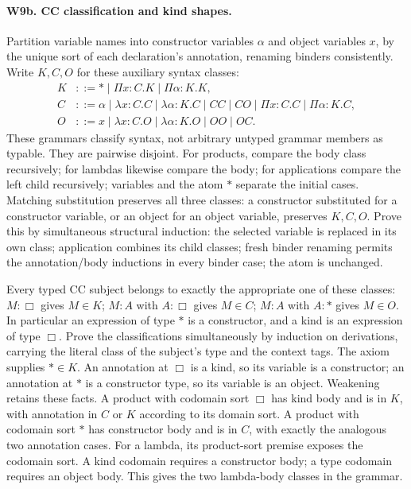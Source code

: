 \paragraph{W9b. CC classification and kind shapes.}
Partition variable names into constructor variables \(\alpha\) and
object variables \(x\), by the unique sort of each declaration's
annotation, renaming binders consistently. Write \(K,C,O\) for these
auxiliary syntax classes:
\[
\begin{aligned}
 K&::=\ast\mid\Pi x:C.K\mid\Pi\alpha:K.K,\\
 C&::=\alpha\mid\lambda x:C.C\mid\lambda\alpha:K.C
       \mid CC\mid CO\mid\Pi x:C.C\mid\Pi\alpha:K.C,\\
 O&::=x\mid\lambda x:C.O\mid\lambda\alpha:K.O\mid OO\mid OC.
\end{aligned}
\]
These grammars classify syntax, not arbitrary untyped grammar members
as typable. They are pairwise disjoint. For products, compare the body
class recursively; for lambdas likewise compare the body; for applications
compare the left child recursively; variables and the atom \(\ast\)
separate the initial cases. Matching substitution preserves all three
classes: a constructor substituted for a constructor variable, or an
object for an object variable, preserves \(K,C,O\). Prove this by
simultaneous structural induction: the selected variable is replaced
in its own class; application combines its child classes; fresh binder
renaming permits the annotation/body inductions in every binder case;
the atom is unchanged.

Every typed CC subject belongs to exactly the appropriate one of these
classes: \(M:\Box\) gives \(M\in K\); \(M:A\) with
\(A:\Box\) gives \(M\in C\); \(M:A\) with \(A:\ast\) gives
\(M\in O\). In particular an expression of type \(\ast\) is a
constructor, and a kind is an expression of type \(\Box\).
Prove the classifications simultaneously by induction on derivations,
carrying the literal class of the subject's type and the context tags.
The axiom supplies \(\ast\in K\). An annotation at \(\Box\) is a
kind, so its variable is a constructor; an annotation at \(\ast\)
is a constructor type, so its variable is an object. Weakening retains
these facts. A product with codomain sort \(\Box\) has kind body and
is in \(K\), with annotation in \(C\) or \(K\) according to its
domain sort. A product with codomain sort \(\ast\) has constructor
body and is in \(C\), with exactly the analogous two annotation cases.
For a lambda, its product-sort premise exposes the codomain sort. A
kind codomain requires a constructor body; a type codomain requires an
object body. This gives the two lambda-body classes in the grammar.

